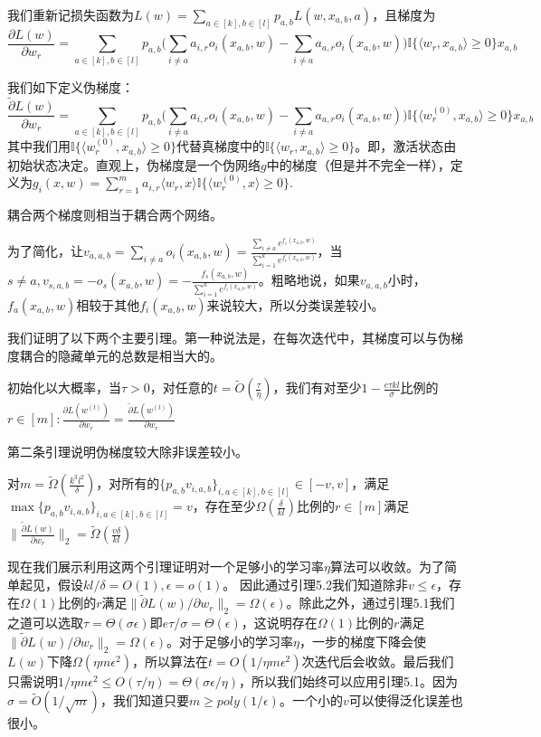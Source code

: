 \par
我们重新记损失函数为$L(w) = \sum_{a\in[k],b\in[l]}p_{a,b} L(w,x_{a,b},a)$，且梯度为
\[
\frac{\partial L(w)}{\partial w_r} = \sum_{a\in[k], b\in [l]}p_{a,b}\bigg(\sum_{i\neq a}a_{i,r}o_i(x_{a,b},w) - \sum_{i\neq a} a_{a,r}o_i(x_{a,b},w)\bigg)\mathbb{I}\{\langle w_r, x_{a,b}\rangle \geq 0\}x_{a,b}
\]
\par
我们如下定义伪梯度：
\[
\frac{\tilde{\partial} L(w)}{\partial w_r} = \sum_{a\in[k], b\in [l]}p_{a,b}\bigg(\sum_{i\neq a}a_{i,r}o_i(x_{a,b},w) - \sum_{i\neq a} a_{a,r}o_i(x_{a,b},w)\bigg)\mathbb{I}\{\langle w_r^{(0)}, x_{a,b}\rangle \geq 0\}x_{a,b}
\]
其中我们用$\mathbb{I}\{\langle w_r^{(0)}, x_{a,b}\rangle \geq 0\}$代替真梯度中的$\mathbb{I}\{\langle w_r, x_{a,b}\rangle \geq 0\}$。即，激活状态由初始状态决定。直观上，伪梯度是一个伪网络$g$中的梯度（但是并不完全一样），定义为$g_i(x,w) = \sum_{r = 1}^m a_{i,r}\langle w_r, x\rangle \mathbb{I}\{\langle w_r^{(0)},x\rangle\geq 0\}$.
\par
耦合两个梯度则相当于耦合两个网络。
\par
为了简化，让$v_{a,a,b} = \sum_{i\neq a} o_i(x_{a,b},w) = \frac{\sum_{i\neq a} e^{f_i(x_{a,b},w)}}{\sum_{i=1}^k e^{f_i(x_{a,b},w)}}$，当$s\neq a,v_{s,a,b} = -o_s(x_{a,b},w) = -\frac{f_s(x_{a,b},w)}{\sum_{i=1}^k e^{f_i(x_{a,b},w)}}$。粗略地说，如果$v_{a,a,b}$小时，$f_a(x_{a,b},w)$相较于其他$f_i(x_{a,b},w)$来说较大，所以分类误差较小。
\par
我们证明了以下两个主要引理。第一种说法是，在每次迭代中，其梯度可以与伪梯度耦合的隐藏单元的总数是相当大的。

\begin{lemma}
初始化以大概率，当$\tau>0$，对任意的$t = \tilde{O}(\frac{\tau}{\eta})$，我们有对至少$1-\frac{e\tau kl}{\sigma}$比例的$r\in [m]: \frac{\partial L(w^{(t)})}{\partial w_r} = \frac{\tilde{\partial}L(w^{(t)})}{\partial w_r} $
\end{lemma}
\par
第二条引理说明伪梯度较大除非误差较小。
\begin{lemma}
对$m = \tilde{\Omega}(\frac{k^3 l^2}{\delta})$，对所有的$\{p_{a,b}v_{i,a,b}\}_{i,a\in[k],b\in[l]}\in[-v,v]$，满足$\max \{p_{a,b}v_{i,a,b}\}_{i,a\in[k],b\in[l]} = v$，存在至少$\Omega(\frac{\delta}{kl})$比例的$r\in[m]$满足$\|\frac{\tilde{\partial} L(w)}{\partial w_r}\|_2 = \tilde{\Omega}(\frac{v\delta}{kl})$
\end{lemma}
\par
现在我们展示利用这两个引理证明对一个足够小的学习率$\eta$算法可以收敛。为了简单起见，假设$kl/\delta = O(1),\epsilon = o(1)$。 因此通过引理5.2我们知道除非$v\leq \epsilon$，存在$\Omega(1)$比例的$r$满足$\|\tilde{\partial}L(w)/\partial w_r\|_2 = \Omega(\epsilon)$。除此之外，通过引理5.1我们之道可以选取$\tau = \Theta(\sigma\epsilon)$即$e\tau/\sigma = \Theta(\epsilon)$，这说明存在$\Omega(1)$比例的$r$满足$\|\tilde{\partial}L(w)/\partial w_r\|_2 = \Omega(\epsilon)$。对于足够小的学习率$\eta$，一步的梯度下降会使$L(w)$下降$\Omega(\eta m \epsilon^2)$，所以算法在$t = O(1/\eta m \epsilon^2)$次迭代后会收敛。最后我们只需说明$1/\eta m \epsilon^2\leq O(\tau/\eta) = \Theta(\sigma\epsilon/\eta)$，所以我们始终可以应用引理5.1。因为$\sigma = \tilde{O}(1/\sqrt{m})$，我们知道只要$m\geq poly(1/\epsilon)$。一个小的$v$可以使得泛化误差也很小。

